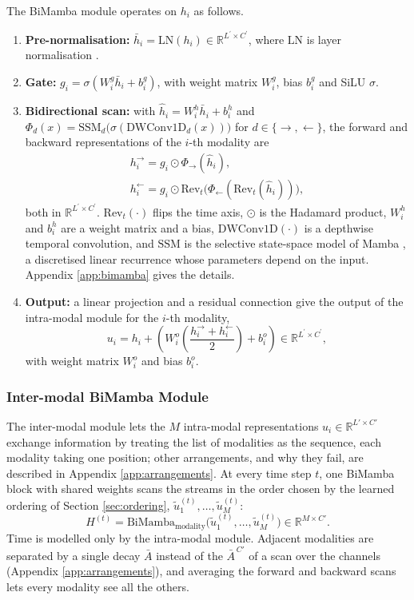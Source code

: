 \documentclass[10pt,a4paper,twocolumn]{article}
\newcommand{\R}{\mathbb{R}}
\begin{document}
	The BiMamba module operates on $h_i$ as follows.
	\begin{enumerate}
		\item \textbf{Pre-normalisation:} $\bar{h}_{i} = \text{LN}(h_{i}) \in \R^{L^{\prime}\times C^{\prime}}$, where $\text{LN}$ is layer normalisation \cite{ba2016layernorm}.
		
		\item \textbf{Gate:} $g_{i}=\sigma(W_{i}^{g}\bar{h}_{i}+b_{i}^{g})$, with weight matrix $W_{i}^{g}$, bias $b_{i}^{g}$ and SiLU $\sigma$.
		
		\item \textbf{Bidirectional scan:} with $\hat{h}_i = W_{i}^{h}\bar{h}_{i}+b_{i}^{h}$ and $\Phi_{d}(x) = \text{SSM}_{d}\bigl(\sigma(\text{DWConv1D}_{d}(x))\bigr)$ for $d \in \{{\rightarrow}, {\leftarrow}\}$, the forward and backward representations of the $i$-th modality are
		$$\begin{gathered}h_{i}^{\rightarrow}=g_{i}\odot \Phi_{\rightarrow}(\hat{h}_i), \\ h_{i}^{\leftarrow}=g_{i}\odot \text{Rev}_{t}\bigl(\Phi_{\leftarrow}(\text{Rev}_{t}(\hat{h}_i))\bigr),\end{gathered}$$
		    both in $\R^{L^{\prime}\times C^{\prime}}$. $\text{Rev}_{t}(\cdot)$ flips the time axis, $\odot$ is the Hadamard product, $W_{i}^{h}$ and $b_{i}^{h}$ are a weight matrix and a bias, $\text{DWConv1D}(\cdot)$ is a depthwise temporal convolution, and $\text{SSM}$ is the selective state-space model of Mamba \cite{gu2023mamba}, a discretised linear recurrence whose parameters depend on the input. Appendix \ref{app:bimamba} gives the details.
	
		\item \textbf{Output:} a linear projection and a residual connection give the output of the intra-modal module for the $i$-th modality,
	$$u_{i}=h_{i}+\left(W_{i}^{o}\left(\frac{h_{i}^{\rightarrow}+h_{i}^{\leftarrow}}{2}\right)+b_{i}^{o}\right)\in\R^{L^{\prime}\times C^{\prime}},$$
	with weight matrix $W_{i}^{o}$ and bias $b_{i}^{o}$.
	\end{enumerate}

	\subsubsection{Inter-modal BiMamba Module}
	\label{sec:intermodal}
	The inter-modal module lets the $M$ intra-modal representations $u_i \in \R^{L' \times C'}$ exchange information by treating the list of modalities as the sequence, each modality taking one position; other arrangements, and why they fail, are described in Appendix \ref{app:arrangements}. At every time step $t$, one BiMamba block with shared weights scans the streams in the order chosen by the learned ordering of Section \ref{sec:ordering}, $\tilde{u}_1^{(t)}, \dots, \tilde{u}_M^{(t)}$:
	$$H^{(t)} = \text{BiMamba}_{\text{modality}} \bigl(\tilde{u}_1^{(t)}, \dots, \tilde{u}_M^{(t)}\bigr) \in \R^{M \times C'}.$$
	Time is modelled only by the intra-modal module. Adjacent modalities are separated by a single decay $\bar{A}$ instead of the $\bar{A}^{\,C'}$ of a scan over the channels (Appendix \ref{app:arrangements}), and averaging the forward and backward scans lets every modality see all the others.
\end{document}
